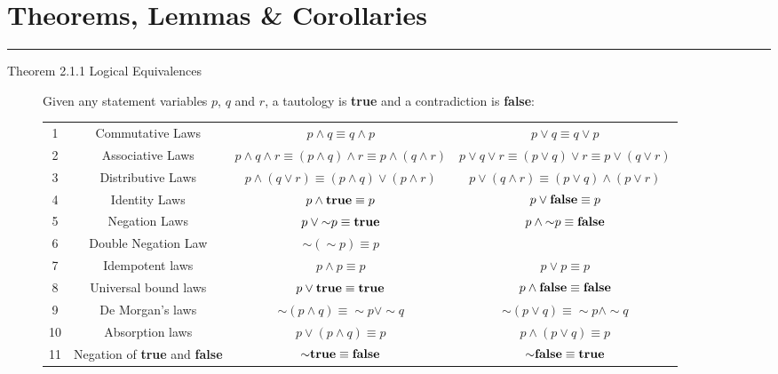 \documentclass{article}
\begin{document}
\section*{Theorems, Lemmas \& Corollaries}
\hrule
\vspace{0.3cm}
\begin{description}

    \item[Theorem 2.1.1 Logical Equivalences]Given any statement variables $p$, $q$ and $r$, a tautology is \textbf{true} and a contradiction is \textbf{false}: 
    \begin{table}[h]
        \centering
        {
        \begin{tabular}{|c|c|c|c|}
            \hline
             1 & Commutative Laws & $p \wedge q\equiv q\wedge p$ & $p \vee q\equiv q\vee p$ \\
             2 & Associative Laws & $p\wedge q\wedge r\equiv (p\wedge q)\wedge r\equiv p\wedge(q\wedge r)$ & $p\vee q\vee r\equiv (p\vee q)\vee r\equiv p\vee(q\vee r)$ \\
             3 & Distributive Laws & $p\wedge (q\vee r)\equiv(p\wedge q)\vee(p\wedge r)$ & $p\vee (q\wedge r)\equiv(p\vee q)\wedge(p\vee r)$ \\ 
             4 & Identity Laws & $p\wedge\text{\textbf{true}}\equiv p$ & $p\vee\text{\textbf{false}}\equiv p$ \\
             5 & Negation Laws & $p\vee{\sim} p\equiv\text{\textbf{true}}$ & $p\wedge{\sim} p\equiv\text{\textbf{false}}$ \\
             6 & Double Negation Law & ${\sim}({\sim} p)\equiv p$ &  \\
             7 & Idempotent laws & $p\wedge p\equiv p$ & $p\vee p\equiv p$ \\
             8 & Universal bound laws & $p\vee\text{\textbf{true}}\equiv\text{\textbf{true}}$ & $p\wedge\text{\textbf{false}}\equiv\text{\textbf{false}}$ \\
             9 & De Morgan's laws & ${\sim}(p\wedge q)\equiv{\sim} p\vee{\sim} q$ & ${\sim}(p\vee q)\equiv{\sim} p\wedge{\sim} q$ \\
             10 & Absorption laws & $p\vee(p\wedge q)\equiv p$ & $p\wedge(p\vee q)\equiv p$ \\
             11 & Negation of \textbf{true} and \textbf{false} & ${\sim}\text{\textbf{true}}\equiv\text{\textbf{false}}$ & ${\sim}\text{\textbf{false}}\equiv\text{\textbf{true}}$ \\

\end{tabular}}
\end{table}
\end{description}
\end{document}
